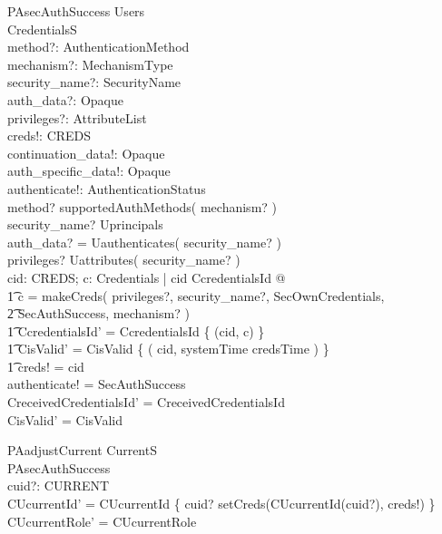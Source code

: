 \begin{schema}{PAsecAuthSuccess}
  \Xi Users \\
  \Delta CredentialsS \\
  method?: AuthenticationMethod \\
  mechanism?: MechanismType \\
  security\_name?: SecurityName \\
  auth\_data?: Opaque \\
  privileges?: AttributeList \\
  creds!: CREDS \\
  continuation\_data!: Opaque \\
  auth\_specific\_data!: Opaque \\
  authenticate!: AuthenticationStatus \\
  \where
  method? \notin supportedAuthMethods( mechanism? ) \\
  security\_name? \in Uprincipals \\
  auth\_data? = Uauthenticates( security\_name? ) \\
  \ran privileges? \subseteq Uattributes( security\_name? ) \\

  \exists cid: CREDS; c: Credentials | cid \notin \dom CcredentialsId @ \\
  \t1 c = makeCreds( privileges?, security\_name?, SecOwnCredentials, \\
  \t2 SecAuthSuccess, mechanism? ) \\
  \t1 \land CcredentialsId' = CcredentialsId \cup \{ (cid, c) \} \\
  \t1 \land CisValid' = CisValid \cup \{ ( cid, systemTime \utctp
  credsTime ) \} \\
  \t1 \land creds! = cid \\

  authenticate! = SecAuthSuccess \\
  CreceivedCredentialsId' = CreceivedCredentialsId  \\
  CisValid' = CisValid \\
\end{schema}
\begin{schema}{PAadjustCurrent}
  \Delta CurrentS \\
  PAsecAuthSuccess \\
  cuid?: CURRENT \\
  \where
  CUcurrentId' = CUcurrentId \oplus \{ cuid? \mapsto
  setCreds(CUcurrentId(cuid?), creds!) \} \\
  CUcurrentRole' = CUcurrentRole \\
\end{schema}


